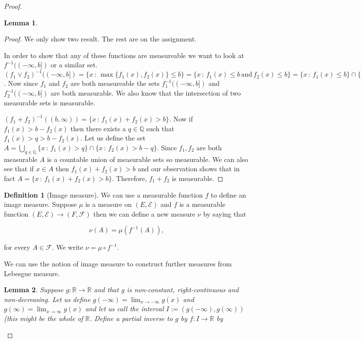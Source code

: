 \documentclass[
]{book}
\newtheorem{lemma}{Lemma}[chapter]
\theoremstyle{definition}
\newtheorem{definition}{Definition}[chapter]
\theoremstyle{definition}
\theoremstyle{definition}
\theoremstyle{definition}
\theoremstyle{remark}
\begin{document}
\begin{proof}
\begin{lemma}
\end{lemma}

\begin{proof}
We only show two result. The rest are on the assignment.

In order to show that any of these functions are measureable we want to look at \(f^{-1}((-\infty, b])\) or a similar set. \((f_1 \vee f_2)^{-1}((-\infty, b]) = \{ x \,:\, \max\{f_1(x), f_2(x)\} \leq b\} = \{ x \,:\, f_1(x) \leq b \, \mbox{and} \, f_2(x) \leq b\} = \{ x \,:\, f_1(x) \leq b \} \cap \{x \,:\, f_2(x) \leq b\} = f_1^{-1}((-\infty, b]) \cap f_2^{-1}((-\infty, b])\). Now since \(f_1\) and \(f_2\) are both measureable the sets \(f_1^{-1}((-\infty, b])\) and \(f_2^{-1}((-\infty, b])\) are both measurable. We also know that the intersection of two measurable sets is measurable.

\((f_1+f_2)^{-1}((b,\infty)) = \{ x \,:\, f_1(x) + f_2(x) > b \}\). Now if \(f_1(x) > b-f_2(x)\) then there exists a \(q \in \mathbb{Q}\) such that \(f_1(x)> q > b - f_2(x)\). Let us define the set \(A= \bigcup_{q \in \mathbb{Q}} \{ x \,:\, f_1(x) > q\} \cap \{ x\,:\, f_2(x) > b-q\}\). Since \(f_1,f_2\) are both measurable \(A\) is a countable union of measurable sets so measurable. We can also see that if \(x \in A\) then \(f_1(x) + f_2(x) > b\) and our observation shows that in fact \(A= \{ x \,:\, f_1(x) + f_2(x) > b \}\). Therefore, \(f_1+f_2\) is measurable.
\end{proof}

\begin{definition}[Image measure]
We can use a measurable function \(f\) to define an image measure. Suppose \(\mu\) is a measure on \((E, \mathcal{E})\) and \(f\) is a measurable function \((E, \mathcal{E}) \rightarrow (F, \mathcal{F})\) then we can define a new measure \(\nu\) by saying that

\[ \nu(A) = \mu(f^{-1}(A)),  \]

for every \(A \in \mathcal{F}\). We write \(\nu = \mu \circ f^{-1}\).
\end{definition}

We can use the notion of image measure to construct further measures from Lebesgue measure.

\begin{lemma}
Suppose \(g: \mathbb{R} \rightarrow \mathbb{R}\) and that \(g\) is non-constant, right-continuous and non-decreasing. Let us define \(g(-\infty) = \lim_{x \rightarrow -\infty} g(x)\) and \(g(\infty) = \lim_{x \rightarrow \infty} g(x)\) and let us call the interval \(I:= (g(-\infty),g(\infty))\) (this might be the whole of \(\mathbb{R}\). Define a partial inverse to \(g\) by \(f: I \rightarrow \mathbb{R}\) by


\end{lemma}
\end{proof}
\end{document}

